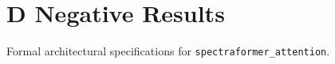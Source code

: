 \section{D Negative Results}

Formal architectural specifications for \texttt{spectraformer_attention}.
